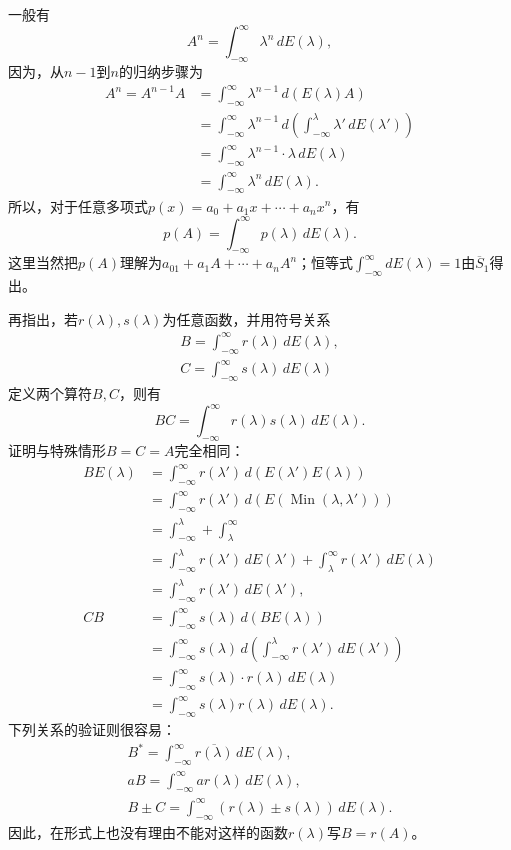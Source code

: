 \documentclass[fontsize=13pt,twoside,openany,headings=normal,parskip=false,bookmarkpackage=false,DIV=calc]{scrbook}
\begin{document}
\hypertarget{origpage-74}{}\label{origpage-74}一般有
\[
A^n=\int_{-\infty}^{\infty}\lambda^n\,dE(\lambda),
\]
因为，从$n-1$到$n$的归纳步骤为
\begin{align*}
A^n=A^{n-1}A
&=\int_{-\infty}^{\infty}\lambda^{n-1}\,d(E(\lambda)A)\\
&=\int_{-\infty}^{\infty}\lambda^{n-1}\,d\left(\int_{-\infty}^{\lambda}\lambda'\,dE(\lambda')\right)\\
&=\int_{-\infty}^{\infty}\lambda^{n-1}\cdot\lambda\,dE(\lambda)\\
&=\int_{-\infty}^{\infty}\lambda^n\,dE(\lambda).
\end{align*}
所以，对于任意多项式$p(x)=a_0+a_1x+\cdots+a_nx^n$，有
\[
p(A)=\int_{-\infty}^{\infty}p(\lambda)\,dE(\lambda).
\]
这里当然把$p(A)$理解为$a_01+a_1A+\cdots+a_nA^n$；恒等式$\int_{-\infty}^{\infty}dE(\lambda)=1$由$\hyperref[cond:II.Sbar1]{\overline{S}_1}$得出。

再指出，若$r(\lambda),\allowbreak s(\lambda)$为任意函数，并用符号关系
\begin{gather*}
B=\int_{-\infty}^{\infty}r(\lambda)\,dE(\lambda),\\
C=\int_{-\infty}^{\infty}s(\lambda)\,dE(\lambda)
\end{gather*}
定义两个算符$B,\allowbreak C$，则有
\[
BC=\int_{-\infty}^{\infty}r(\lambda)s(\lambda)\,dE(\lambda).
\]
证明与特殊情形$B=C=A$完全相同：
\begin{align*}
BE(\lambda)&=\int_{-\infty}^{\infty}r(\lambda')\,d(E(\lambda')E(\lambda))\\
&=\int_{-\infty}^{\infty}r(\lambda')\,d(E(\operatorname{Min}(\lambda,\lambda')))\\
&=\int_{-\infty}^{\lambda}+\int_\lambda^{\infty}\\
&=\int_{-\infty}^{\lambda}r(\lambda')\,dE(\lambda')+\int_\lambda^{\infty}r(\lambda')\,dE(\lambda)\\
&=\int_{-\infty}^{\lambda}r(\lambda')\,dE(\lambda'),\\
CB&=\int_{-\infty}^{\infty}s(\lambda)\,d(BE(\lambda))\\
&=\int_{-\infty}^{\infty}s(\lambda)\,d\left(\int_{-\infty}^{\lambda}r(\lambda')\,dE(\lambda')\right)\\
&=\int_{-\infty}^{\infty}s(\lambda)\cdot r(\lambda)\,dE(\lambda)\\
&=\int_{-\infty}^{\infty}s(\lambda)r(\lambda)\,dE(\lambda).
\end{align*}
下列关系的验证则很容易：
\begin{gather*}
B^*=\int_{-\infty}^{\infty}\overline{r(\lambda)}\,dE(\lambda),\\
aB=\int_{-\infty}^{\infty}ar(\lambda)\,dE(\lambda),\\
B\pm C=\int_{-\infty}^{\infty}(r(\lambda)\pm s(\lambda))\,dE(\lambda).
\end{gather*}
因此，在形式上也没有理由不能对这样的函数$r(\lambda)$写$B=r(A)$。
\end{document}
